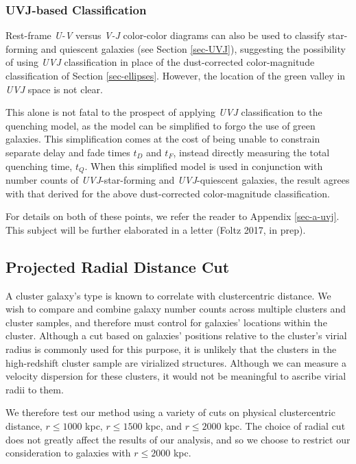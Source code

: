 \subsubsection{UVJ-based Classification}

Rest-frame \textit{U-V} versus \textit{V-J} color-color diagrams can also be used to classify star-forming and quiescent galaxies (see Section \ref{sec-UVJ}), suggesting the possibility of using \textit{UVJ} classification in place of the dust-corrected color-magnitude classification of Section \ref{sec-ellipses}.
However, the location of the green valley in \textit{UVJ} space is not clear.

This alone is not fatal to the prospect of applying \textit{UVJ} classification to the quenching model, as the model can be simplified to forgo the use of green galaxies.
This simplification comes at the cost of being unable to constrain separate delay and fade times $t_D$ and $t_F$, instead directly measuring the total quenching time, $t_Q$.
When this simplified model is used in conjunction with number counts of \textit{UVJ}-star-forming and \textit{UVJ}-quiescent galaxies, the result agrees with that derived for the above dust-corrected color-magnitude classification.

For details on both of these points, we refer the reader to Appendix \ref{sec-a-uvj}.
This subject will be further elaborated in a letter (Foltz 2017, in prep).

\subsection{Projected Radial Distance Cut}\label{sec-r}

A cluster galaxy's type is known to correlate with clustercentric distance.
We wish to compare and combine galaxy number counts across multiple clusters and cluster samples, and therefore must control for galaxies' locations within the cluster.
Although a cut based on galaxies' positions relative to the cluster's virial radius is commonly used for this purpose, it is unlikely that the clusters in the high-redshift cluster sample are virialized structures.
Although we can measure a velocity dispersion for these clusters, it would not be meaningful to ascribe virial radii to them.

We therefore test our method using a variety of cuts on physical clustercentric distance, $r \leq 1000$ kpc, $r \leq 1500$ kpc, and $r \leq 2000$ kpc.
The choice of radial cut does not greatly affect the results of our analysis, and so we choose to restrict our consideration to galaxies with $r \leq 2000$ kpc.

